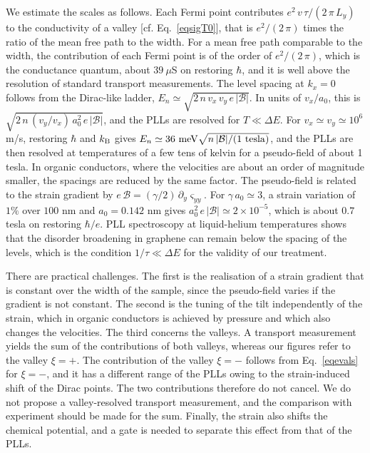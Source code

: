 \documentclass[aps,prb, onecolumn, nofootinbib, citeautoscript,10pt]{revtex4-2}
\begin{document}
We estimate the scales as follows. Each Fermi point contributes $e^2\,v\,\tau/(2\,\pi\,L_y)$ to the conductivity of a valley [cf. Eq.~\eqref{eqsigT0}], that is $e^2/(2\,\pi)$ times the ratio of the mean free path to the width. For a mean free path comparable to the width, the contribution of each Fermi point is of the order of $e^2/(2\,\pi)$, which is the conductance quantum, about $39\ \mu$S on restoring $\hbar$, and it is well above the resolution of standard transport measurements. The level spacing at $k_x=0$ follows from the Dirac-like ladder, $E_n\simeq\sqrt{2\,n\,v_x\,v_y\,e\,|\mathcal B|}$. In units of $v_x/a_0$, this is $\sqrt{2\,n\,(v_y/v_x)\,a_0^2\,e\,|\mathcal B|}$, and the PLLs are resolved for $T\ll\Delta E$. For $v_x\simeq v_y\simeq10^6$ m/s, restoring $\hbar$ and $k_{\rm B}$ gives $E_n\simeq36\ {\rm meV}\sqrt{n\,|\mathcal B|/(1\ {\rm tesla})}$, and the PLLs are then resolved at temperatures of a few tens of kelvin for a pseudo-field of about 1 tesla. In organic conductors, where the velocities are about an order of magnitude smaller, the spacings are reduced by the same factor. The pseudo-field is related to the strain gradient by $e\,\mathcal B=(\gamma/2)\,\partial_y\varsigma_{yy}$. For $\gamma\,a_0\simeq3$, a strain variation of $1\%$ over $100$ nm and $a_0=0.142$ nm gives $a_0^2\,e\,|\mathcal B|\simeq2\times10^{-5}$, which is about $0.7$ tesla on restoring $\hbar/e$. PLL spectroscopy at liquid-helium temperatures \cite{levy10} shows that the disorder broadening in graphene can remain below the spacing of the levels, which is the condition $1/\tau\ll\Delta E$ for the validity of our treatment.

There are practical challenges. The first is the realisation of a strain gradient that is constant over the width of the sample, since the pseudo-field varies if the gradient is not constant. The second is the tuning of the tilt independently of the strain, which in organic conductors is achieved by pressure and which also changes the velocities. The third concerns the valleys. A transport measurement yields the sum of the contributions of both valleys, whereas our figures refer to the valley $\xi=+$. The contribution of the valley $\xi=-$ follows from Eq.~\eqref{eqevals} for $\xi=-$, and it has a different range of the PLLs owing to the strain-induced shift of the Dirac points. The two contributions therefore do not cancel. We do not propose a valley-resolved transport measurement, and the comparison with experiment should be made for the sum. Finally, the strain also shifts the chemical potential, and a gate is needed to separate this effect from that of the PLLs.
\end{document}
